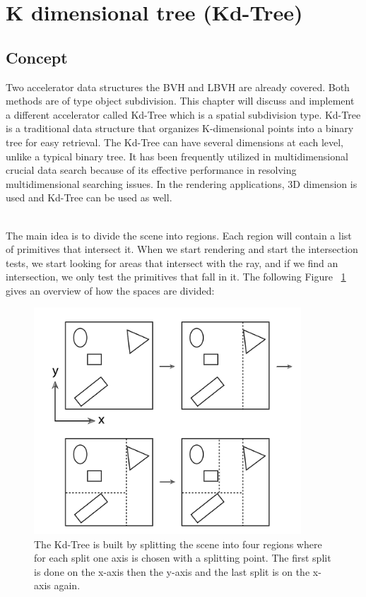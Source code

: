 \documentclass[11pt,a4paper]{article}
\begin{document}
\section{K dimensional tree (Kd-Tree)}
\subsection{Concept}
Two accelerator data structures the BVH and LBVH are already covered. Both methods are of type object subdivision. This chapter will discuss and implement a different accelerator called Kd-Tree which is a spatial subdivision type. Kd-Tree is a traditional data structure that organizes K-dimensional points into a binary tree for easy retrieval. The Kd-Tree can have several dimensions at each level, unlike a typical binary tree. It has been frequently utilized in multidimensional crucial data search because of its effective performance in resolving multidimensional searching issues. In the rendering applications, 3D dimension is used and Kd-Tree can be used as well.

\noindent
\\
The main idea is to divide the scene into regions. Each region will contain a list of primitives that intersect it. When we start rendering and start the intersection tests, we start looking for areas that intersect with the ray, and if we find an intersection, we only test the primitives that fall in it. The following Figure ~\ref{fig:kdtreedemo} gives an overview of how the spaces are divided:


\begin{figure}[h]	
     \centering
     \captionsetup{justification=centering,margin=2cm}
     \includegraphics[width=10cm]{images/kdtree/example_demo.png}
     \caption{The Kd-Tree is built by splitting the scene into four regions where for each split one axis is chosen with a splitting point.  The first split is done on the x-axis then the y-axis and the last split is on the x-axis again. \protect\cite{Pharr2016}}
        \label{fig:kdtreedemo}
\end{figure}
\end{document}
